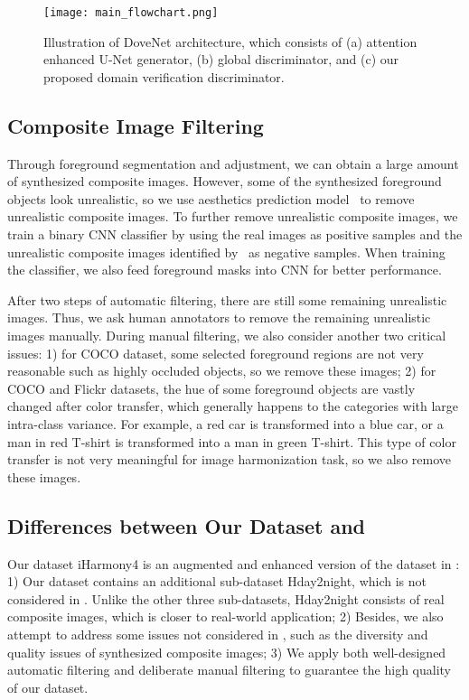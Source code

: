 \documentclass[10pt,twocolumn,letterpaper]{article}
\begin{document}
\begin{figure*}[tp!]
\begin{center}
\texttt{[image: main\_flowchart.png]}
\end{center}
\caption{Illustration of DoveNet architecture, which consists of (a) attention enhanced U-Net generator, (b) global discriminator, and (c) our proposed domain verification discriminator.}
\label{fig:flowchart}
\end{figure*}


\subsection{Composite Image Filtering} \label{sec:syn_img_filter}
Through foreground segmentation and adjustment, we can obtain a large amount of synthesized composite images. However, some of the synthesized foreground objects look unrealistic, so we use aesthetics prediction model~\cite{kong2016photo} to remove unrealistic composite images. To further remove unrealistic composite images, we train a binary CNN classifier by using the real images as positive samples and the unrealistic composite images identified by~\cite{kong2016photo} as negative samples. When training the classifier, we also feed foreground masks into CNN for better performance.

After two steps of automatic filtering, there are still some remaining unrealistic images. Thus, we ask human annotators to remove the remaining unrealistic images manually. During manual filtering, we also consider another two critical issues: 1) for COCO dataset, some selected foreground regions are not very reasonable such as highly occluded objects, so we remove these images; 2) for COCO and Flickr datasets, the hue of some foreground objects are vastly changed after color transfer, which generally happens to the categories with large intra-class variance. For example, a red car is transformed into a blue car, or a man in red T-shirt is transformed into a man in green T-shirt. This type of color transfer is not very meaningful for image harmonization task, so we also remove these images.


\subsection{Differences between Our Dataset and \cite{tsai2017deep}}Our dataset iHarmony4 is an augmented and enhanced version of the dataset in \cite{tsai2017deep}:
1) Our dataset contains an additional sub-dataset Hday2night, which is not considered in \cite{tsai2017deep}. Unlike the other three sub-datasets, Hday2night consists of real composite images, which is closer to real-world application; 2) Besides, we also attempt to address some issues not considered in \cite{tsai2017deep}, such as the diversity and quality issues of synthesized composite images; 3) We apply both well-designed automatic filtering and deliberate manual filtering to guarantee the high quality of our dataset.
\end{document}
